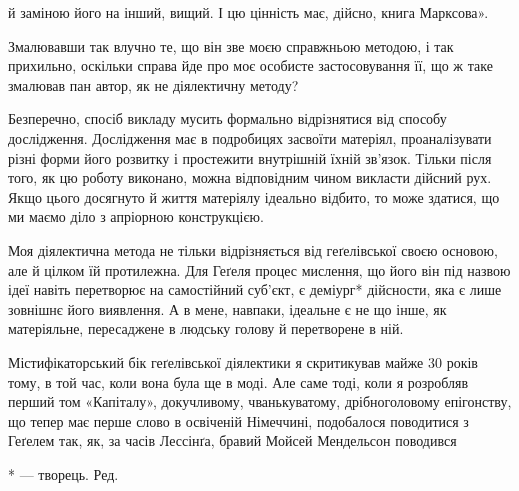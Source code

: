 й заміною його на інший, вищий. І цю цінність має, дійсно,
книга Марксова».

Змалювавши так влучно те, що він зве моєю справжньою методою,
і так прихильно, оскільки справа йде про моє особисте
застосовування її, що ж таке змалював пан автор, як не діялектичну
методу?

Безперечно, спосіб викладу мусить формально відрізнятися
від способу дослідження. Дослідження має в подробицях засвоїти
матеріял, проаналізувати різні форми його розвитку і простежити
внутрішній їхній зв’язок. Тільки після того, як цю роботу виконано,
можна відповідним чином викласти дійсний рух. Якщо
цього досягнуто й життя матеріялу ідеально відбито, то може здатися,
що ми маємо діло з апріорною конструкцією.

Моя діялектична метода не тільки відрізняється від геґелівської
своєю основою, але й цілком їй протилежна. Для Геґеля процес
мислення, що його він під назвою ідеї навіть перетворює на самостійний
суб’єкт, є деміург* дійсности, яка є лише зовнішнє його
виявлення. А в мене, навпаки, ідеальне є не що інше, як матеріяльне,
пересаджене в людську голову й перетворене в ній.

Містифікаторський бік геґелівської діялектики я скритикував майже
30 років тому, в той час, коли вона була ще в моді. Але саме
тоді, коли я розробляв перший том «Капіталу», докучливому,
чванькуватому, дрібноголовому епігонству, що тепер має перше
слово в освіченій Німеччині, подобалося поводитися з Геґелем
так, як, за часів Лессінґа, бравий Мойсей Мендельсон поводився

* — творець. Ред.
